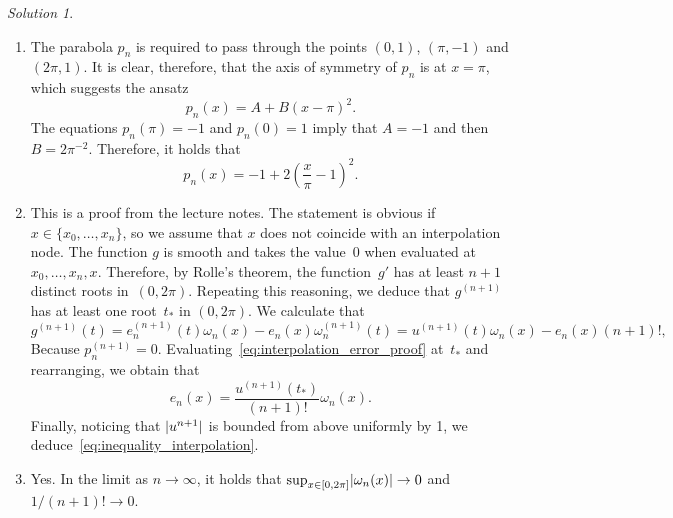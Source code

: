 \documentclass[11pt]{article}
\theoremstyle{definition}
\theoremstyle{remark}
\newtheorem*{solution}{Solution}
\begin{document}
\begin{solution}
    $~$
    \begin{enumerate}

        \item
            The parabola $p_n$ is required to pass through the points $(0, 1)$, $(\pi, -1)$ and $(2\pi, 1)$.
            It is clear, therefore, that the axis of symmetry of $p_n$ is at $x = \pi$,
            which suggests the ansatz
            \[
                p_n(x) = A + B (x - \pi)^2.
            \]
            The equations $p_n(\pi) = -1$ and $p_n(0) = 1$ imply that
            $A = -1$ and then $B = 2\pi^{-2}$.
            Therefore, it holds that
            \[
                p_n(x) = -1 + 2 \left(\frac{x}{\pi} - 1\right)^2.
            \]

        \item
            This is a proof from the lecture notes.
            The statement is obvious if $x \in \{x_0, \dotsc, x_n\}$,
            so we assume that $x$ does not coincide with an interpolation node.
            The function $g$ is smooth and takes the value~0 when evaluated at~$x_0, \dotsc, x_n, x$.
            Therefore, by Rolle's theorem, the function~$g'$ has at least $n+1$ distinct roots in~$(0, 2\pi)$.
            Repeating this reasoning, we deduce that $g^{(n+1)}$ has at least one root~$t_*$ in $(0, 2\pi)$.
            We calculate that
            \begin{equation}
                \label{eq:interpolation_error_proof}
                g^{(n+1)}(t) = e_n^{(n+1)}(t) \omega_n(x) - e_n(x) \omega_n^{(n+1)}(t)
                = u^{(n+1)}(t) \omega_n(x) - e_n(x) (n+1)!,
            \end{equation}
            Because $p_n^{(n+1)} = 0$.
            Evaluating~\eqref{eq:interpolation_error_proof} at~$t_*$ and rearranging,
            we obtain that
            \[
                e_n(x) = \frac{u^{(n+1)}(t_*)}{(n+1)!} \omega_n(x).
            \]
            Finally, noticing that $\lvert u^{n+1}\rvert$ is bounded from above uniformly by 1,
            we deduce~\eqref{eq:inequality_interpolation}.

            \item
                Yes. In the limit as $n \to \infty$,
                it holds that $\sup_{x \in [0, 2\pi]} \lvert\omega_n(x)\rvert \to 0$ and $1/(n+1)! \to 0$.
    \end{enumerate}



\end{solution}
\end{document}
